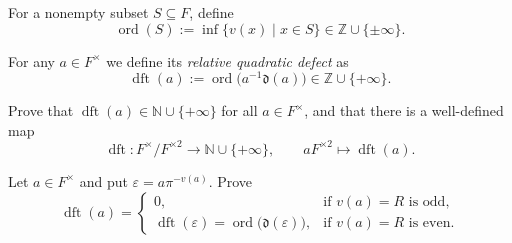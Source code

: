 \documentclass[12pt, a4paper]{article}
\begin{document}
For a nonempty subset $S\subseteq F$, define
\[
    \operatorname{ord}(S):=
    \inf\{v(x)\mid x\in S\}\in \mathbb Z\cup\{\pm\infty\}.
\]

For any $a\in F^\times$ we define its \emph{relative quadratic defect} as
\[
    \operatorname{dft}(a):=
    \operatorname{ord}\bigl(a^{-1}\mathfrak d(a)\bigr)
    \in \mathbb Z\cup\{+\infty\}.
\]

Prove that $\operatorname{dft}(a)\in \mathbb N\cup\{+\infty\}$ for all
$a\in F^\times$, and that there is a well-defined map
\[
    \operatorname{dft}:F^\times/F^{\times 2}
    \longrightarrow
    \mathbb N\cup\{+\infty\},
    \qquad
    aF^{\times 2}\longmapsto \operatorname{dft}(a).
\]

Let $a\in F^\times$ and put $\varepsilon=a\pi^{-v(a)}$. Prove
\[
    \operatorname{dft}(a)=
    \begin{cases}
        0, & \text{if } v(a)=R \text{ is odd},\\
        \operatorname{dft}(\varepsilon)
        =\operatorname{ord}\bigl(\mathfrak d(\varepsilon)\bigr),
        & \text{if } v(a)=R \text{ is even}.
    \end{cases}
\]
\end{document}
